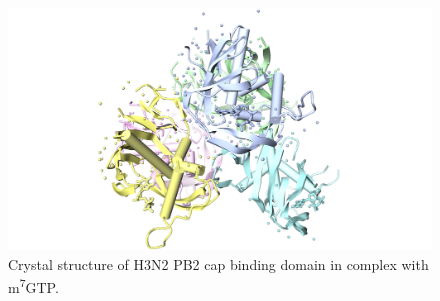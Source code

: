
\begin{figure}
\centering
\includegraphics[width=\linewidth]{../influenza/2VQZ.png}
\caption{Crystal structure of H3N2 PB2 cap binding domain in complex with m\textsuperscript{7}GTP.}
\label{influenza:2VQZ}
\end{figure}

